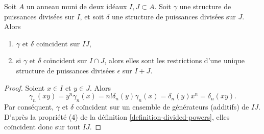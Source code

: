 \begin{lemma}
\label{lemma-two-ideals}
Soit $A$ un anneau muni de deux idéaux $I, J \subset A$.
Soit $\gamma$ une structure de puissances divisées sur $I$, et soit
$\delta$ une structure de puissances divisées sur $J$.
Alors
\begin{enumerate}
\item $\gamma$ et $\delta$ coïncident sur $IJ$,
\item si $\gamma$ et $\delta$ coïncident sur $I \cap J$, alors elles sont
les restrictions d'une unique structure de puissances divisées $\epsilon$
sur $I + J$.
\end{enumerate}
\end{lemma}

\begin{proof}
Soient $x \in I$ et $y \in J$. Alors
$$
\gamma_n(xy) = y^n\gamma_n(x) = n! \delta_n(y) \gamma_n(x) =
\delta_n(y) x^n = \delta_n(xy).
$$
Par conséquent, $\gamma$ et $\delta$ coïncident sur un ensemble de générateurs
(additifs) de $IJ$. D'après la propriété (4) de la définition
\ref{definition-divided-powers}, elles coïncident donc sur tout $IJ$.


\end{proof}
